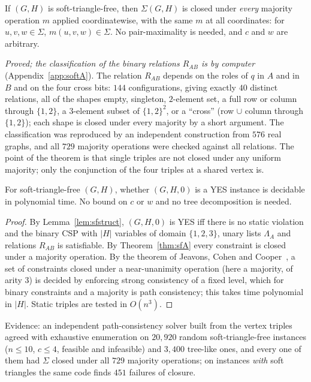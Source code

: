 \begin{theorem}\label{thm:sfA}
If $(G,H)$ is soft-triangle-free, then $\Sigma(G,H)$ is closed under \emph{every} majority operation $m$ applied coordinatewise, with the same $m$ at all coordinates: for $u,v,w\in\Sigma$, $m(u,v,w)\in\Sigma$. No pair-maximality is needed, and $c$ and $w$ are arbitrary.
\end{theorem}
\emph{Proved; the classification of the binary relations $R_{AB}$ is by computer} (Appendix~\ref{app:softA}). The relation $R_{AB}$ depends on the roles of $q$ in $A$ and in $B$ and on the four cross bits: $144$ configurations, giving exactly $40$ distinct relations, all of the shapes empty, singleton, $2$-element set, a full row or column through $\{1,2\}$, a $3$-element subset of $\{1,2\}^2$, or a ``cross'' (row $\cup$ column through $\{1,2\}$); each shape is closed under every majority by a short argument. The classification was reproduced by an independent construction from $576$ real graphs, and all $729$ majority operations were checked against all relations. The point of the theorem is that single triples are not closed under any uniform majority; only the conjunction of the four triples at a shared vertex is.

\begin{corollary}\label{cor:sfpoly}
For soft-triangle-free $(G,H)$, whether $(G,H,0)$ is a YES instance is decidable in polynomial time. No bound on $c$ or $w$ and no tree decomposition is needed.
\end{corollary}
\begin{proof}
By Lemma~\ref{lem:sfstruct}, $(G,H,0)$ is YES iff there is no static violation and the binary CSP with $|H|$ variables of domain $\{1,2,3\}$, unary lists $\Lambda_A$ and relations $R_{AB}$ is satisfiable. By Theorem~\ref{thm:sfA} every constraint is closed under a majority operation. By the theorem of Jeavons, Cohen and Cooper~\cite{JCC98}, a set of constraints closed under a near-unanimity operation (here a majority, of arity $3$) is decided by enforcing strong consistency of a fixed level, which for binary constraints and a majority is path consistency; this takes time polynomial in $|H|$. Static triples are tested in $O(n^3)$.
\end{proof}
Evidence: an independent path-consistency solver built from the vertex triples agreed with exhaustive enumeration on $20{,}920$ random soft-triangle-free instances ($n\le10$, $c\le4$, feasible and infeasible) and $3{,}400$ tree-like ones, and every one of them had $\Sigma$ closed under all $729$ majority operations; on instances \emph{with} soft triangles the same code finds $451$ failures of closure.

